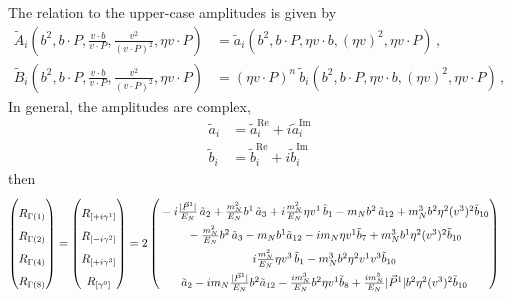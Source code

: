 \documentclass[]{article}
\numberwithin{equation}{section}
\newcommand{\tcdot}{{\cdot}}
\newcommand{\tAmp}{\widetilde{A}}
\newcommand{\tBmp}{\widetilde{B}}
\newcommand{\tAmp}{\ensuremath{\widetilde{A}^{(+)}}}
\newcommand{\tBmp}{\ensuremath{\widetilde{B}^{(+)}}}
\newcommand{\bvec}{b}
\newcommand{\mN}{m_N}
\begin{document}
The relation to the upper-case amplitudes is given by
\begin{align}
	\tAmp_i\left(\bvec^2,\bvec \tcdot P,\frac{v \tcdot \bvec}{v \tcdot P}, \frac{v^2}{(v \tcdot P)^2}, \eta v \tcdot P\right) & = \tilde a_i(\bvec^2,\bvec \tcdot P, \eta v \tcdot b, (\eta v)^2, \eta v \tcdot P)    \, , \nonumber \\
	 \tBmp_i\left(\bvec^2,\bvec \tcdot P,\frac{v \tcdot \bvec}{v \tcdot P}, \frac{v^2}{(v \tcdot P)^2}, \eta v \tcdot P\right) & = (\eta v \tcdot P)^n\ \tilde b_i(\bvec^2,\bvec \tcdot P, \eta v \tcdot b, (\eta v)^2, \eta v \tcdot P)   \, ,
	\label{eq-ab}
\end{align}
In general, the amplitudes are complex,
\begin{align}
    \tilde{a}_i&=\tilde{a}^{\text{Re}}_i+i\tilde{a}^{\text{Im}}_i\\
    \tilde{b}_i&=\tilde{b}^{\text{Re}}_i+i\tilde{b}^{\text{Im}}_i
\end{align}
then
\begin{align}
    \begin{pmatrix}
        \rule{0pt}{16pt} R_{\Gamma(1)}\\
        \rule{0pt}{16pt} R_{\Gamma(2)}\\
        \rule{0pt}{16pt} R_{\Gamma(4)}\\
        \rule{0pt}{16pt} R_{\Gamma(8)}
    \end{pmatrix} = \begin{pmatrix}
        \rule{0pt}{16pt} R_{[+i\gamma^1]}\\
        \rule{0pt}{16pt} R_{[-i\gamma^2]}\\
        \rule{0pt}{16pt} R_{[+i\gamma^3]}\\
        \rule{0pt}{16pt} R_{[\gamma^0]}
    \end{pmatrix} &=2\begin{pmatrix}
        \rule{0pt}{16pt} -i\frac{|\vec{P}^1|}{E_N}\, \tilde a_2+  \frac{\mN^2}{E_N} \bvec^1\, \tilde a_3+ i\frac{\mN^2}{E_N} \eta v^1\, \tilde b_1 
		-  \mN  \bvec^2 \, \tilde a_{12}+  \mN^3  \bvec^2 \eta^2 (v^3)^2 \tilde b_{10}\\
         \rule{0pt}{16pt} -  \frac{\mN^2}{E_N} \bvec^2\, \tilde a_3
		-  \mN   \bvec^1  \tilde a_{12}-i \mN \eta  v^1  \tilde b_7+ \mN^3  \bvec^1 \eta^2 (v^3)^2 \tilde b_{10}\\
        \rule{0pt}{16pt} i\frac{\mN^2}{E_N} \eta v^3\, \tilde b_1-  \mN^3 \bvec^2 \eta^2 v^1 v^3\tilde b_{10}\\
         \rule{0pt}{16pt}   \tilde a_2  - i \mN  \frac{|\vec{P}^1|}{E_N} \bvec^2  \tilde a_{12}- \frac{ i \mN^3}{E_N}  \bvec^2 \eta v^1  \tilde b_8+ \frac{i \mN^3}{E_N}  |\vec{P}^1| \bvec^2 \eta^2 (v^3)^2 \tilde b_{10}
    \end{pmatrix}
\end{align}
\end{document}
